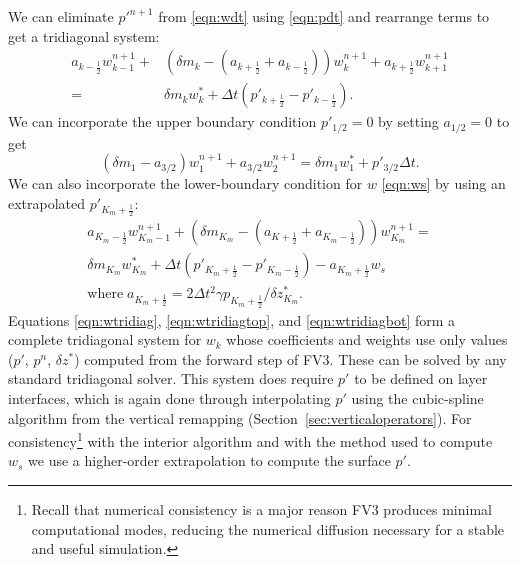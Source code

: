 \documentclass[10pt,letterpaper,margin=1in]{memoir}
\newcommand{\half}{\frac{1}{2}}
\begin{document}
We can eliminate $p'^{n+1}$ from \eqref{eqn:wdt} using \eqref{eqn:pdt} and rearrange terms to get a tridiagonal system:
\begin{equation} \label{eqn:wtridiag}
\begin{split}
a_{k-\half}w^{n+1}_{k-1} +& \left (\delta m_k - \left ( a_{k+\half} + a_{k-\half} \right ) \right ) w^{n+1}_k + a_{k+\half}w^{n+1}_{k+1} 
\\ = & \delta m_k w^*_k + \Delta t \left ( p'_{k+\half} - p'_{k-\half} \right ).
\end{split}
\end{equation}
We can incorporate the upper boundary condition $p'_{1/2} = 0$ by setting $a_{1/2} = 0$ to get
\begin{equation} \label{eqn:wtridiagtop}
\left ( \delta m_1 - a_{3/2} \right ) w^{n+1}_1 + a_{3/2} w^{n+1}_2 = \delta m_1 w^*_1 + p'_{3/2} \Delta t .
\end{equation}
We can also incorporate the lower-boundary condition for $w$ \eqref{eqn:ws} by using an extrapolated $p'_{K_m+\half}$:
\begin{equation} \label{eqn:wtridiagbot}
\begin{split}
a_{K_m-\half} w^{n+1}_{K_m-1} + \left ( \delta m_{K_m} - \left ( a_{K+\half} + a_{{K_m}-\half} \right ) \right ) w^{n+1}_{K_m} = \\ \delta m_{K_m} w^*_{K_m} + \Delta t \left (p'_{{K_m}+\half} - p'_{{K_m}-\half} \right ) - a_{{K_m}+\half}w_s \\ \mathrm{where}\; a_{{K_m}+\half} = 2\Delta t^2 \gamma p_{{K_m}+\half} / \delta z^*_{K_m} .
\end{split}
\end{equation}
Equations \eqref{eqn:wtridiag}, \eqref{eqn:wtridiagtop}, and \eqref{eqn:wtridiagbot} form a complete tridiagonal system for $w_k$ whose coefficients and weights use only values ($p'$, $p^n$, $\delta z^*$) computed from the forward step of FV3. These can be solved by any standard tridiagonal solver. 
This system does require $p'$ to be defined on layer interfaces, which is again done through interpolating $p'$ using the cubic-spline algorithm from the vertical remapping (Section~\ref{sec:verticaloperators}). For consistency\footnote{Recall that numerical consistency is a major reason FV3 produces minimal computational modes, reducing the numerical diffusion necessary for a stable and useful simulation.} with the interior algorithm and with the method used to compute $w_s$ we use a higher-order extrapolation to compute the surface $p'$.
\end{document}
